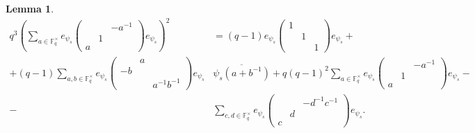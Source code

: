 \documentclass[12pt,reqno]{amsart}
\newtheorem{lem}[thm]{Lemma}
\theoremstyle{definition}
\theoremstyle{remark}
\numberwithin{equation}{section}
\begin{document}
    \begin{lem}\label{B_3}
        \begin{align*}
            q^3\left(\sum_{a \in \mathbb{F}_q^\times} e_{\psi_s} \begin{pmatrix}
                & & -a^{-1}\\
                & 1 &\\
                a & &
            \end{pmatrix} e_{\psi_s}\right)^2 &= (q-1) e_{\psi_s} \begin{pmatrix}
                1 & & \\
                & 1 &\\
                & & 1
            \end{pmatrix} e_{\psi_s} +\\+ (q-1) \sum_{a, b \in \mathbb{F}_q^\times} e_{\psi_s} \begin{pmatrix}
                & a & \\
                -b & & \\
                & & a^{-1}b^{-1}
            \end{pmatrix} e_{\psi_s} &\overline{\psi_s(a + b^{-1})}+q(q-1)^2 \sum_{a \in \mathbb{F}_q^\times} e_{\psi_s} \begin{pmatrix}
                & & -a^{-1}\\
                & 1 &\\
                a & &
            \end{pmatrix} e_{\psi_s}-\\-& \sum_{c, d \in \mathbb{F}_q^\times} e_{\psi_s}
            \begin{pmatrix}
                & & -d^{-1}c^{-1}\\
                & d & \\
                c & &
            \end{pmatrix} e_{\psi_s}.
        \end{align*}
    \end{lem}
\end{document}
